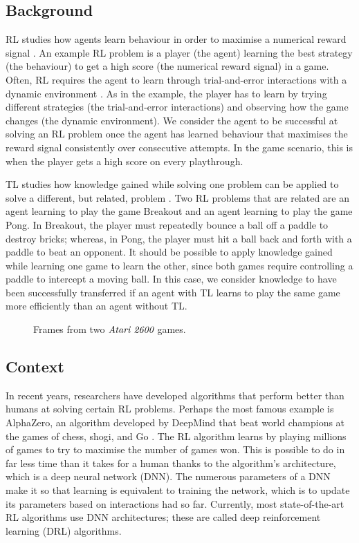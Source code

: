 \documentclass[12pt,a4paper]{article}
\begin{document}
\subsection{Background} 
RL studies how agents learn behaviour in order to maximise a numerical reward signal \cite{sutton2018reinforcement}. An example RL problem is a player (the agent) learning the best strategy (the behaviour) to get a high score (the numerical reward signal) in a game. Often, RL requires the agent to learn through trial-and-error interactions with a dynamic environment \cite{Kaelbling1996}. As in the example, the player has to learn by trying different strategies (the trial-and-error interactions) and observing how the game changes (the dynamic environment). We consider the agent to be successful at solving an RL problem once the agent has learned behaviour that maximises the reward signal consistently over consecutive attempts. In the game scenario, this is when the player gets a high score on every playthrough. 

TL studies how knowledge gained while solving one problem can be applied to solve a different, but related, problem \cite{2010}. Two RL problems that are related are an agent learning to play the game Breakout and an agent learning to play the game Pong. In Breakout, the player must repeatedly bounce a ball off a paddle to destroy bricks; whereas, in Pong, the player must hit a ball back and forth with a paddle to beat an opponent. It should be possible to apply knowledge gained while learning one game to learn the other, since both games require controlling a paddle to intercept a moving ball. In this case, we consider knowledge to have been successfully transferred if an agent with TL learns to play the same game more efficiently than an agent without TL.

\begin{figure}[h]
    \centering
    \hfill
    \caption{Frames from two $\emph{Atari 2600}$ games.}
\end{figure}

\subsection{Context}
In recent years, researchers have developed algorithms that perform better than humans at solving certain RL problems. Perhaps the most famous example is AlphaZero, an algorithm developed by DeepMind that beat world champions at the games of chess, shogi, and Go \cite{Silver1140}. The RL algorithm learns by playing millions of games to try to maximise the number of games won. This is possible to do in far less time than it takes for a human thanks to the algorithm's architecture, which is a deep neural network (DNN). The numerous parameters of a DNN make it so that learning is equivalent to training the network, which is to update its parameters based on interactions had so far. Currently, most state-of-the-art RL algorithms use DNN architectures; these are called deep reinforcement learning (DRL) algorithms.
\end{document}
